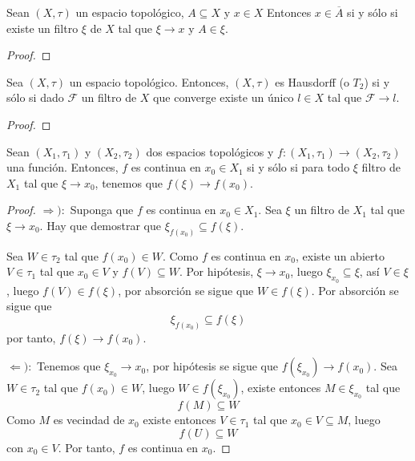 \documentclass[12pt]{report}
\theoremstyle{largebreak}
\newcommand\cf[3]{\ensuremath{#1:#2\rightarrow#3}}
\newcommand{\Cls}[1]{\ensuremath{\overline{#1}}}
\begin{document}
    \begin{excer}
        Sean $(X,\tau)$ un espacio topológico, $A\subseteq X$ y $x\in X$ Entonces $x\in\Cls{A}$ si y sólo si existe un filtro $\xi$ de $X$ tal que $\xi\rightarrow x$ y $A\in\xi$. 
    \end{excer}

    \begin{proof}
        
    \end{proof}

    \begin{excer}
        Sea $(X,\tau)$ un espacio topológico. Entonces, $(X,\tau)$ es Hausdorff (o $T_2$) si y sólo si dado $\mathcal{F}$ un filtro de $X$ que converge existe un único $l\in X$ tal que $\mathcal{F}\rightarrow l$.
    \end{excer}

    \begin{proof}
        
    \end{proof}

    \begin{propo}
        Sean $(X_1,\tau_1)$ y $(X_2,\tau_2)$ dos espacios topológicos y $\cf{f}{(X_1,\tau_1)}{(X_2,\tau_2)}$ una función. Entonces, $f$ es continua en $x_0\in X_1$ si y sólo si para todo $\xi$ filtro de $X_1$ tal que $\xi\rightarrow x_0$, tenemos que $f(\xi)\rightarrow f(x_0)$.
    \end{propo}

    \begin{proof}
        $\Rightarrow):$ Suponga que $f$ es continua en $x_0\in X_1$. Sea $\xi$ un filtro de $X_1$ tal que $\xi\rightarrow x_0$. Hay que demostrar que $\xi_{ f(x_0)}\subseteq f(\xi)$.

        Sea $W\in\tau_2$ tal que $f(x_0)\in W$. Como $f$ es continua en $x_0$, existe un abierto $V\in\tau_1$ tal que $x_0\in V$ y $f(V)\subseteq W$. Por hipótesis, $\xi\rightarrow x_0$, luego $\xi_{ x_0}\subseteq \xi$, así $V\in\xi$, luego $f(V)\in f(\xi)$, por absorción se sigue que $W\in f(\xi)$. Por absorción se sigue que
        \begin{equation*}
            \xi_{ f(x_0)}\subseteq f(\xi)
        \end{equation*}
        por tanto, $f(\xi)\rightarrow f(x_0)$.

        $\Leftarrow):$ Tenemos que $\xi_{ x_0}\rightarrow x_0$, por hipótesis se sigue que $f(\xi_{ x_0})\rightarrow f(x_0)$. Sea $W\in\tau_2$ tal que $f(x_0)\in W$, luego $W\in f(\xi_{ x_0})$, existe entonces $M\in\xi_{ x_0}$ tal que
        \begin{equation*}
            f(M)\subseteq W
        \end{equation*}
        Como $M$ es vecindad de $x_0$ existe entonces $V\in\tau_1$ tal que $x_0\in V\subseteq M$, luego
        \begin{equation*}
            f(U)\subseteq W
        \end{equation*}
        con $x_0\in V$. Por tanto, $f$ es continua en $x_0$.
    \end{proof}
\end{document}
